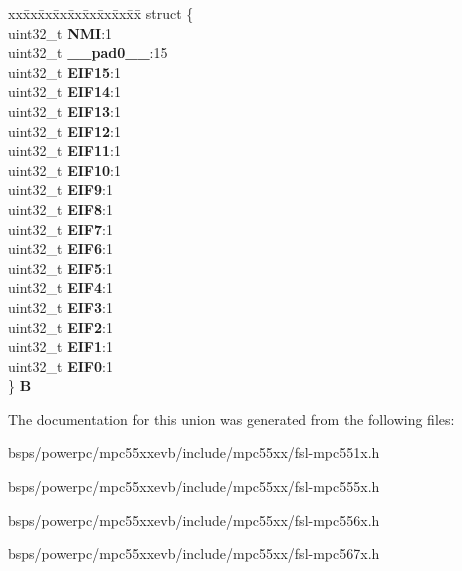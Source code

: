 \begin{DoxyCompactItemize}
\begin{tabbing}
\end{tabbing}\item 
\mbox{\label{unionSIU__tag_1_1SIU__EISR__tag_a907af946e52fabd0ea2de3cda55488a9}} 
\begin{tabbing}
xx\=xx\=xx\=xx\=xx\=xx\=xx\=xx\=xx\=\kill
struct \{\\
\>uint32\_t {\bfseries NMI}:1\\
\>uint32\_t {\bfseries \_\_pad0\_\_}:15\\
\>uint32\_t {\bfseries EIF15}:1\\
\>uint32\_t {\bfseries EIF14}:1\\
\>uint32\_t {\bfseries EIF13}:1\\
\>uint32\_t {\bfseries EIF12}:1\\
\>uint32\_t {\bfseries EIF11}:1\\
\>uint32\_t {\bfseries EIF10}:1\\
\>uint32\_t {\bfseries EIF9}:1\\
\>uint32\_t {\bfseries EIF8}:1\\
\>uint32\_t {\bfseries EIF7}:1\\
\>uint32\_t {\bfseries EIF6}:1\\
\>uint32\_t {\bfseries EIF5}:1\\
\>uint32\_t {\bfseries EIF4}:1\\
\>uint32\_t {\bfseries EIF3}:1\\
\>uint32\_t {\bfseries EIF2}:1\\
\>uint32\_t {\bfseries EIF1}:1\\
\>uint32\_t {\bfseries EIF0}:1\\
\} {\bfseries B}\\

\end{tabbing}\end{DoxyCompactItemize}


The documentation for this union was generated from the following files\+:\begin{DoxyCompactItemize}
\item 
bsps/powerpc/mpc55xxevb/include/mpc55xx/fsl-\/mpc551x.\+h\item 
bsps/powerpc/mpc55xxevb/include/mpc55xx/fsl-\/mpc555x.\+h\item 
bsps/powerpc/mpc55xxevb/include/mpc55xx/fsl-\/mpc556x.\+h\item 
bsps/powerpc/mpc55xxevb/include/mpc55xx/fsl-\/mpc567x.\+h\end{DoxyCompactItemize}
